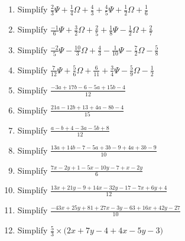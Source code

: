 \documentclass[16pt]{article}
\theoremstyle{remark}
\begin{document}
\begin{enumerate}
\item Simplify $\frac{2}{3}\Psi + \frac{1}{4} \Omega + \frac{4}{3} + \frac{4}{5}\Psi+\frac{1}{2}\Omega+\frac{1}{6}$
\vspace{5cm}
\item Simplify $\frac{-1}{6}\Psi + \frac{3}{2} \Omega + \frac{2}{5} + \frac{1}{8}\Psi-\frac{1}{2}\Omega+\frac{2}{7}$
\vspace{5cm}
\item Simplify $\frac{-2}{5}\Psi - \frac{10}{3} \Omega + \frac{4}{3} - \frac{1}{10}\Psi-\frac{7}{2}\Omega-\frac{5}{8}$
\vspace{5cm}
\item Simplify $\frac{7}{12}\Psi + \frac{5}{6} \Omega + \frac{6}{11} + \frac{3}{4}\Psi-\frac{5}{9}\Omega-\frac{1}{2}$
\vspace{5cm}

\newpage
\item Simplify $\displaystyle{\frac{-3a+17b-6-5a+15b-4}{12}}$
\vspace{5cm}
\item Simplify $\displaystyle{\frac{21a-12b+13+4a-8b-4}{15}}$
\vspace{5cm}
\item Simplify $\displaystyle{\frac{a-b+4-3a-5b+8}{12}}$
\vspace{5cm}
\item Simplify $\displaystyle{\frac{13a+14b-7-5a+3b-9+4a+3b-9}{10}}$
\vspace{5cm}
\newpage

\item Simplify $\displaystyle{\frac{7x-2y+1-5x-10y-7+x-2y}{6}}$
\vspace{5cm}
\item Simplify $\displaystyle{\frac{13x+21y-9+14x-32y-17-7x+6y+4}{12}}$
\vspace{5cm}
\item Simplify $\displaystyle{\frac{-43x+25y+81+27x-3y-63+16x+42y-27}{10}}$
\vspace{5cm}
\item Simplify $\displaystyle{\frac{5}{3} \times \bigg( 2x + 7y - 4 + 4x-5y-3 \bigg)}$
\vspace{5cm}
\end{enumerate}
\end{document}
